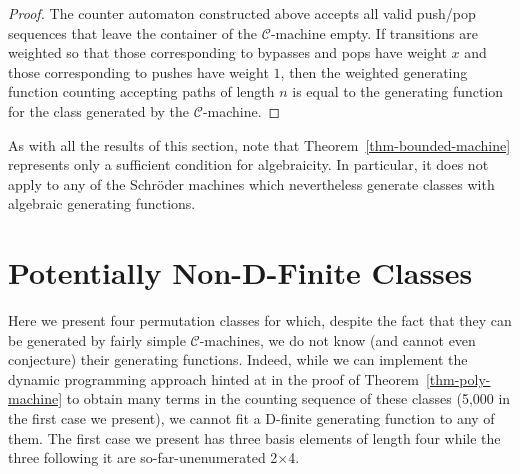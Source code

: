 \documentclass[10pt]{article}
\theoremstyle{plain}
\theoremstyle{definition}
\newcommand{\C}{\mathcal{C}}
\begin{document}
\begin{proof}
	
	The counter automaton constructed above accepts all valid push/pop sequences that leave the container of the $\C$-machine empty. If transitions are weighted so that those corresponding to bypasses and pops have weight $x$ and those corresponding to pushes have weight $1$, then the weighted generating function counting accepting paths of length $n$ is equal to the generating function for the class generated by the $\C$-machine.
\end{proof}

As with all the results of this section, note that Theorem~\ref{thm-bounded-machine} represents only a sufficient condition for algebraicity. In particular, it does not apply to any of the Schr\"oder machines which nevertheless generate classes with algebraic generating functions.

%
%
%
%
%

\section{Potentially Non-D-Finite Classes}
\label{sec-non-D-finite}

Here we present four permutation classes for which, despite the fact that they can be generated by fairly simple $\C$-machines, we do not know (and cannot even conjecture) their generating functions. Indeed, while we can implement the dynamic programming approach hinted at in the proof of Theorem~\ref{thm-poly-machine} to obtain many terms in the counting sequence of these classes (5,000 in the first case we present), we cannot fit a D-finite generating function to any of them. The first case we present has three basis elements of length four while the three following it are so-far-unenumerated 2$\times$4.
\end{document}
